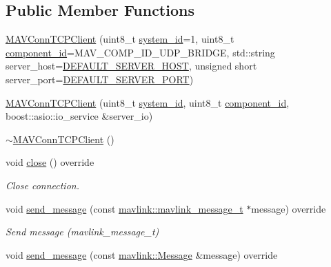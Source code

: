 \subsection*{Public Member Functions}
\begin{DoxyCompactItemize}
\item 
\mbox{\hyperlink{group__mavconn_ga930d7bcb750e00606a1ba406135f0020}{M\+A\+V\+Conn\+T\+C\+P\+Client}} (uint8\+\_\+t \mbox{\hyperlink{setHome_8cpp_a83150acb88d810ae6864b4c125324ed6}{system\+\_\+id}}=1, uint8\+\_\+t \mbox{\hyperlink{setHome_8cpp_adc84285d5da2c4fa9721d0a32d5e41a7}{component\+\_\+id}}=M\+A\+V\+\_\+\+C\+O\+M\+P\+\_\+\+I\+D\+\_\+\+U\+D\+P\+\_\+\+B\+R\+I\+D\+GE, std\+::string server\+\_\+host=\mbox{\hyperlink{group__mavconn_ga25f08b85aaeacae255d37a898f978c42}{D\+E\+F\+A\+U\+L\+T\+\_\+\+S\+E\+R\+V\+E\+R\+\_\+\+H\+O\+ST}}, unsigned short server\+\_\+port=\mbox{\hyperlink{group__mavconn_ga3d9c438ece25a8aa6ae7af15341e7706}{D\+E\+F\+A\+U\+L\+T\+\_\+\+S\+E\+R\+V\+E\+R\+\_\+\+P\+O\+RT}})
\item 
\mbox{\hyperlink{group__mavconn_ga93a7b76eccf987b4321f7bcc502001b8}{M\+A\+V\+Conn\+T\+C\+P\+Client}} (uint8\+\_\+t \mbox{\hyperlink{setHome_8cpp_a83150acb88d810ae6864b4c125324ed6}{system\+\_\+id}}, uint8\+\_\+t \mbox{\hyperlink{setHome_8cpp_adc84285d5da2c4fa9721d0a32d5e41a7}{component\+\_\+id}}, boost\+::asio\+::io\+\_\+service \&server\+\_\+io)
\item 
\mbox{\hyperlink{group__mavconn_gaa9e9ea305aaaa39aeb4bcb91328d47c5}{$\sim$\+M\+A\+V\+Conn\+T\+C\+P\+Client}} ()
\item 
void \mbox{\hyperlink{group__mavconn_ga3128ab3303f5a303be12c2c9df1ee321}{close}} () override
\begin{DoxyCompactList}\small\item\em Close connection. \end{DoxyCompactList}\item 
void \mbox{\hyperlink{group__mavconn_ga6f835299707df78f3694cef5853139d4}{send\+\_\+message}} (const \mbox{\hyperlink{include__v0_89_2mavlink__types_8h_a63b963764c09dc72f4910c1521e325b9}{mavlink\+::mavlink\+\_\+message\+\_\+t}} $\ast$message) override
\begin{DoxyCompactList}\small\item\em Send message (mavlink\+\_\+message\+\_\+t) \end{DoxyCompactList}\item 
void \mbox{\hyperlink{group__mavconn_ga1194ffc5b74604c5c432591751803f33}{send\+\_\+message}} (const \mbox{\hyperlink{structmavlink_1_1Message}{mavlink\+::\+Message}} \&message) override

\end{DoxyCompactItemize}
